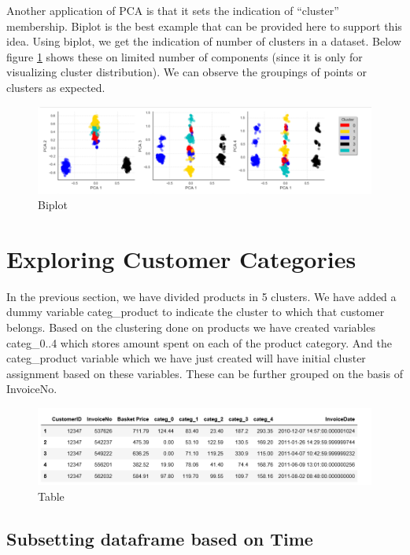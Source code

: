 Another application of PCA is that it sets the indication of “cluster” membership. Biplot is the best example that can be provided here to support this idea. Using biplot, we get the indication of number of clusters in a dataset. Below figure \ref{3.6} shows these on limited number of components (since it is only for visualizing cluster distribution). We can observe the groupings of points or clusters as expected.\\

\begin{figure}[H]
\caption{Biplot}
\label{3.6}
\centering
\includegraphics[width=\columnwidth]{images/3_6.PNG}
\end{figure}

\section{Exploring Customer Categories}


In the previous section, we have divided products in 5 clusters. We have added a dummy variable categ\_product to indicate the cluster to which that customer belongs. Based on the clustering done on products we have created variables categ\_0..4 which stores amount spent on each of the product category. And the categ\_product variable which we have just created will have initial cluster assignment based on these variables. These can be further grouped on the basis of InvoiceNo.\\

\begin{figure}[H]
\caption{Table}
\label{4.1}
\centering
\includegraphics[width=\columnwidth]{images/4_1.PNG}
\end{figure}


\subsection{Subsetting dataframe based on Time}


